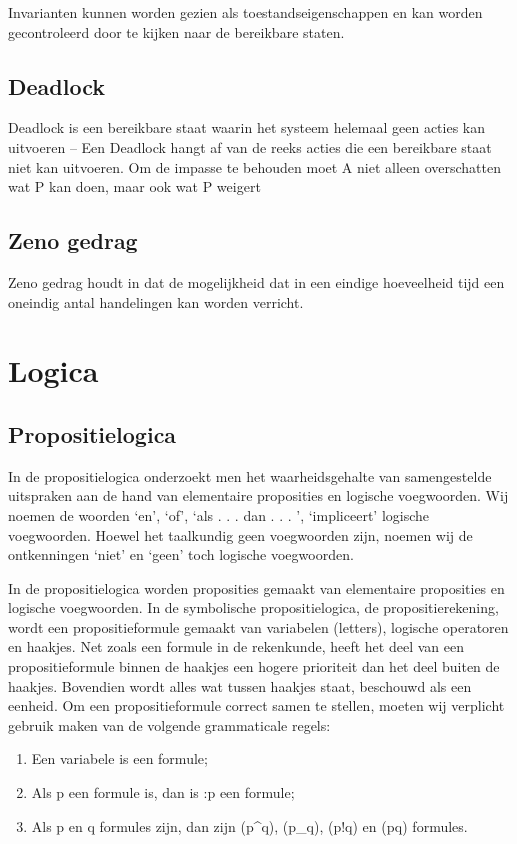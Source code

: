 \documentclass{article}
\begin{document}
	Invarianten kunnen worden gezien als toestandseigenschappen en 	kan worden gecontroleerd door te kijken naar de bereikbare staten. 
	
	\subsection{Deadlock}
	Deadlock is een bereikbare staat waarin het systeem   helemaal geen acties kan uitvoeren – Een Deadlock hangt af van de reeks acties die een bereikbare staat niet kan uitvoeren. Om de impasse te behouden moet A niet alleen overschatten wat P kan doen, maar ook wat P weigert
	\subsection{Zeno gedrag}
	Zeno gedrag houdt in dat de mogelijkheid dat in een eindige hoeveelheid tijd een oneindig antal handelingen kan worden verricht.
	
	
	\section{Logica}
	
	
	
	\subsection{Propositielogica}
	
	
	In de propositielogica onderzoekt men het waarheidsgehalte van samengestelde uitspraken
	aan de hand van elementaire proposities en logische voegwoorden. Wij noemen de
	woorden ‘en’, ‘of’, ‘als . . . dan . . . ’, ‘impliceert’ logische voegwoorden. Hoewel het taalkundig
	geen voegwoorden zijn, noemen wij de ontkenningen ‘niet’ en ‘geen’ toch logische
	voegwoorden.
	
	In de propositielogica worden proposities gemaakt van elementaire proposities en logische
	voegwoorden. In de symbolische propositielogica, de propositierekening, wordt een
	propositieformule gemaakt van variabelen (letters), logische operatoren en haakjes. Net
	zoals een formule in de rekenkunde, heeft het deel van een propositieformule binnen de
	haakjes een hogere prioriteit dan het deel buiten de haakjes. Bovendien wordt alles wat
	tussen haakjes staat, beschouwd als een eenheid. Om een propositieformule correct samen
	te stellen, moeten wij verplicht gebruik maken van de volgende grammaticale regels:
	\begin{enumerate}
		\item Een variabele is een formule;
		\item Als p een formule is, dan is :p een formule;
		\item Als p en q formules zijn, dan zijn (p^q), (p_q), (p!q) en (p\text{$}q) formules.
	\end{enumerate}
	
\end{document}

